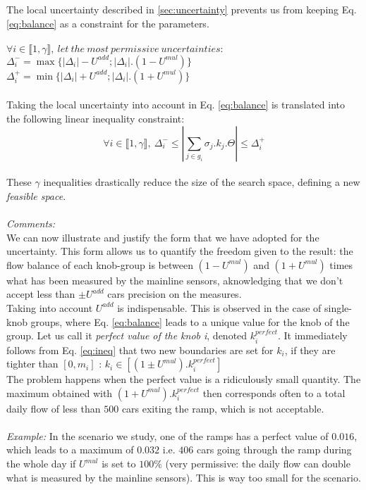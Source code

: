 The local uncertainty described in \ref{sec:uncertainty} prevents us from keeping Eq. \ref{eq:balance} as a constraint for the parameters.\\
\\
$\forall i \in {\llbracket 1,\gamma \rrbracket},\ let\ the\ most\ permissive\ uncertainties:$\\
$\Delta_{i}^{-}=\max{\{|\Delta_{i}|-U^{add};|\Delta_{i}|.(1-U^{mul})\}}$\\
$\Delta_{i}^{+}=\min{\{|\Delta_{i}|+U^{add};|\Delta_{i}|.(1+U^{mul})\}}$\\
\\
Taking the local uncertainty into account in Eq. \ref{eq:balance} is translated into the following linear inequality constraint:
\begin{equation}
\label{eq:ineq}
	\forall i\in \llbracket 1,\gamma \rrbracket,\ \Delta_{i}^{-}\leq |\sum\limits_{j\in g_{i}}\sigma_{j}.k_{j}.\Theta| \leq \Delta_{i}^{+}
\end{equation}
\\
These $\gamma$ inequalities drastically reduce the size of the search space, defining a new \emph{feasible space}.\\
\\
\emph{Comments:}\\
We can now illustrate and justify the form that we have adopted for the uncertainty. This form allows us to quantify the freedom given to the result: the flow balance of each knob-group is between $(1-U^{mul})$ and $(1+U^{mul})$ times what has been measured by the mainline sensors, aknowledging that we don't accept less than $\pm U^{add}$ cars precision on the measures.\\
Taking into account $U^{add}$ is indispensable. This is observed in the case of single-knob groups, where Eq. \ref{eq:balance} leads to a unique value for the knob of the group. Let us call it \emph{perfect value of the knob i}, denoted $k_{i}^{perfect}$. It immediately follows from Eq. \ref{eq:ineq} that two new boundaries are set for $k_{i}$, if they are tighter than $[0,m_{i}]$ : $k_{i}\in [(1\pm U^{mul}).k_{i}^{perfect}]$\\
The problem happens when the perfect value is a ridiculously small quantity. The maximum obtained with $(1+ U^{mul}).k_{i}^{perfect}$ then corresponds often to a total daily flow of less than $500$ cars exiting the ramp, which is not acceptable.\\ 
\\
\emph{Example:} In the scenario we study, one of the ramps has a perfect value of $0.016$, which leads to a maximum of $0.032$ i.e. $406$ cars going through the ramp during the whole day if $U^{mul}$ is set to $100\%$ (very permissive: the daily flow can double what is measured by the mainline sensors). This is way too small for the scenario.\\ 
